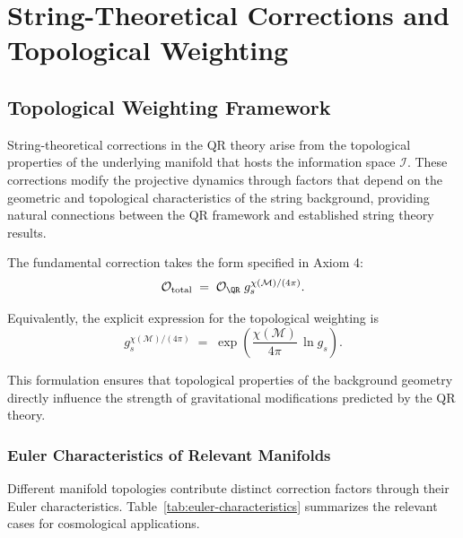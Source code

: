 \section{String-Theoretical Corrections and Topological Weighting}
\label{sec:string-corrections}

\subsection{Topological Weighting Framework}
\label{subsec:topological-framework}

String-theoretical corrections in the QR theory arise from the topological properties of the underlying manifold that hosts the information space $\mathcal{I}$. These corrections modify the projective dynamics through factors that depend on the geometric and topological characteristics of the string background, providing natural connections between the QR framework and established string theory results.

The fundamental correction takes the form specified in Axiom 4:
\begin{equation}
\mathcal{O}_{\text{total}} \;=\; \mathcal{O}_{\QR}\; g_s^{\chi(\mathcal{M})/(4\pi)} .
\label{eq:string-correction-fundamental}
\end{equation}

Equivalently, the explicit expression for the topological weighting is
\begin{equation}
g_s^{\chi(\mathcal{M})/(4\pi)}
 \;=\; \exp\!\left(\frac{\chi(\mathcal{M})}{4\pi}\,\ln g_s\right).
\label{eq:topological-weighting-explicit}
\end{equation}

This formulation ensures that topological properties of the background geometry directly influence the strength of gravitational modifications predicted by the QR theory.

\subsubsection{Euler Characteristics of Relevant Manifolds}
\label{subsubsec:euler-characteristics}

Different manifold topologies contribute distinct correction factors through their Euler characteristics. Table~\ref{tab:euler-characteristics} summarizes the relevant cases for cosmological applications.

